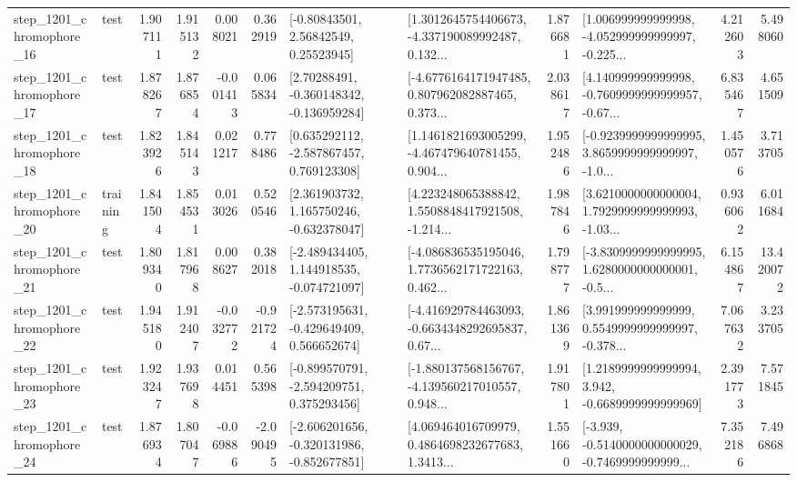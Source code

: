 \begin{tabular}{llrrrrllrlrr}
 step\_1201\_chromophore\_16 &      test &      1.907111 &    1.915132 &      0.008021 &  0.362919 &       [-0.80843501, 2.56842549, 0.25523945] &  [1.3012645754406673, -4.337190089992487, 0.132... &       1.876681 &  [1.006999999999998, -4.052999999999997, -0.225... &            4.212603 &          5.498060 \\
 step\_1201\_chromophore\_17 &      test &      1.878267 &    1.876854 &     -0.001413 &  0.065834 &    [2.70288491, -0.360148342, -0.136959284] &  [-4.6776164171947485, 0.807962082887465, 0.373... &       2.038617 &  [4.140999999999998, -0.7609999999999957, -0.67... &            6.835467 &          4.651509 \\
 step\_1201\_chromophore\_18 &      test &      1.823926 &    1.845143 &      0.021217 &  0.778486 &    [0.635292112, -2.587867457, 0.769123308] &  [1.1461821693005299, -4.467479640781455, 0.904... &       1.952486 &  [-0.9239999999999995, 3.8659999999999997, -1.0... &            1.450576 &          3.713705 \\
 step\_1201\_chromophore\_20 &  training &      1.841504 &    1.854531 &      0.013026 &  0.520546 &    [2.361903732, 1.165750246, -0.632378047] &  [4.223248065388842, 1.5508848417921508, -1.214... &       1.987846 &  [3.6210000000000004, 1.7929999999999993, -1.03... &            0.936062 &          6.011684 \\
 step\_1201\_chromophore\_21 &      test &      1.809340 &    1.817968 &      0.008627 &  0.382018 &   [-2.489434405, 1.144918535, -0.074721097] &  [-4.086836535195046, 1.7736562171722163, 0.462... &       1.798777 &  [-3.8309999999999995, 1.6280000000000001, -0.5... &            6.154867 &         13.420072 \\
 step\_1201\_chromophore\_22 &      test &      1.945180 &    1.912407 &     -0.032772 & -0.921724 &   [-2.573195631, -0.429649409, 0.566652674] &  [-4.416929784463093, -0.6634348292695837, 0.67... &       1.861369 &  [3.991999999999999, 0.5549999999999997, -0.378... &            7.067632 &          3.233705 \\
 step\_1201\_chromophore\_23 &      test &      1.923247 &    1.937698 &      0.014451 &  0.565398 &   [-0.899570791, -2.594209751, 0.375293456] &  [-1.880137568156767, -4.139560217010557, 0.948... &       1.917801 &   [1.2189999999999994, 3.942, -0.6689999999999969] &            2.391773 &          7.571845 \\
 step\_1201\_chromophore\_24 &      test &      1.876934 &    1.807047 &     -0.069886 & -2.090495 &  [-2.606201656, -0.320131986, -0.852677851] &  [4.069464016709979, 0.4864698232677683, 1.3413... &       1.551660 &  [-3.939, -0.5140000000000029, -0.7469999999999... &            7.352186 &          7.496868 \\

\end{tabular}
